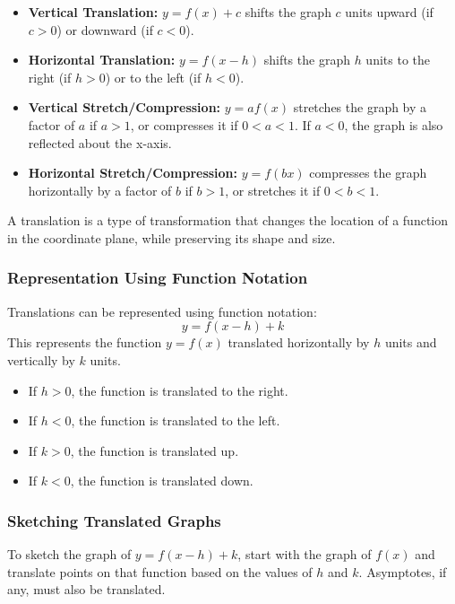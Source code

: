 \documentclass[12pt,a4paper]{article}
\begin{document}
\begin{itemize}
    \item \textbf{Vertical Translation:} \( y = f(x) + c \) shifts the graph \(c\) units upward (if \(c > 0\)) or downward (if \(c < 0\)).
    \item \textbf{Horizontal Translation:} \( y = f(x - h) \) shifts the graph \(h\) units to the right (if \(h > 0\)) or to the left (if \(h < 0\)).
    \item \textbf{Vertical Stretch/Compression:} \( y = af(x) \) stretches the graph by a factor of \(a\) if \(a > 1\), or compresses it if \(0 < a < 1\). If \(a < 0\), the graph is also reflected about the x-axis.
    \item \textbf{Horizontal Stretch/Compression:} \( y = f(bx) \) compresses the graph horizontally by a factor of \(b\) if \(b > 1\), or stretches it if \(0 < b < 1\).
\end{itemize}

A translation is a type of transformation that changes the location of a function in the coordinate plane, while preserving its shape and size.

\subsubsection{Representation Using Function Notation}
Translations can be represented using function notation:
\[ y = f(x - h) + k \]
This represents the function \( y = f(x) \) translated horizontally by \( h \) units and vertically by \( k \) units.

\begin{itemize}
    \item If \( h > 0 \), the function is translated to the right.
    \item If \( h < 0 \), the function is translated to the left.
    \item If \( k > 0 \), the function is translated up.
    \item If \( k < 0 \), the function is translated down.
\end{itemize}

\subsubsection*{Sketching Translated Graphs}
To sketch the graph of \( y = f(x - h) + k \), start with the graph of \( f(x) \) and translate points on that function based on the values of \( h \) and \( k \). Asymptotes, if any, must also be translated.
\end{document}
